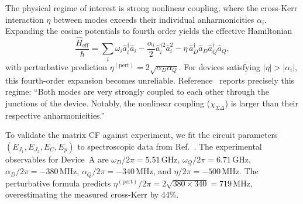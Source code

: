 \documentclass[reprint, floatfix, superscriptaddress, amsmath, amssymb, longbibliography]{revtex4-2}
\begin{document}
The physical regime of interest is strong nonlinear coupling, where the cross-Kerr interaction $\eta$ between modes exceeds their individual anharmonicities $\alpha_i$. Expanding the cosine potentials to fourth order yields the effective Hamiltonian
\begin{equation}
\frac{\hat{H}_{\mathrm{eff}}}{\hbar} = \sum_{i} \omega_i \hat{a}^\dagger_i \hat{a}_i - \frac{\alpha_i}{2} \hat{a}^{\dagger 2}_i \hat{a}^2_i - \eta\, \hat{a}^\dagger_D \hat{a}_D \hat{a}^\dagger_Q \hat{a}_Q,
\end{equation}
with perturbative prediction $\eta^{(\mathrm{pert})} = 2\sqrt{\alpha_D \alpha_Q}$. For devices satisfying $|\eta| > |\alpha_i|$, this fourth-order expansion becomes unreliable. Reference~\cite{Wills2022} reports precisely this regime: ``Both modes are very strongly coupled to each other through the junctions of the device. Notably, the nonlinear coupling ($\chi_{\Sigma\Delta}$) is larger than their respective anharmonicities.''

To validate the matrix CF against experiment, we fit the circuit parameters $(E_{J_1}, E_{J_2}, E_C, E_p)$ to spectroscopic data from Ref.~\cite{Wills2022}. The experimental observables for Device~A are $\omega_D/2\pi = 5.51$\,GHz, $\omega_Q/2\pi = 6.71$\,GHz, $\alpha_D/2\pi = -380$\,MHz, $\alpha_Q/2\pi = -340$\,MHz, and $\eta/2\pi = -500$\,MHz. The perturbative formula predicts $\eta^{(\mathrm{pert})}/2\pi = 2\sqrt{380 \times 340} = 719$\,MHz, overestimating the measured cross-Kerr by 44\%.
\end{document}
